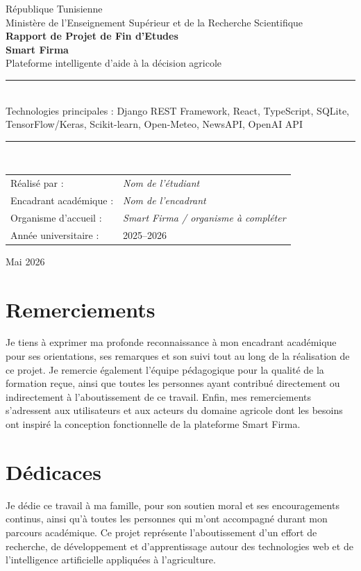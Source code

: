 \documentclass[12pt,a4paper]{report}
\begin{document}
\begin{titlepage}
\centering
\vspace*{1cm}
{\Large République Tunisienne}\\[0.2cm]
{\large Ministère de l'Enseignement Supérieur et de la Recherche Scientifique}\\[1.5cm]
{\Huge\bfseries Rapport de Projet de Fin d'Etudes}\\[0.8cm]
{\LARGE\bfseries Smart Firma}\\[0.3cm]
{\Large Plateforme intelligente d'aide à la décision agricole}\\[1cm]
\rule{0.85\textwidth}{0.5pt}\\[0.5cm]
{\large Technologies principales : Django REST Framework, React, TypeScript, SQLite, TensorFlow/Keras, Scikit-learn, Open-Meteo, NewsAPI, OpenAI API}\\[0.5cm]
\rule{0.85\textwidth}{0.5pt}\\[1.5cm]
\begin{tabular}{ll}
Réalisé par : & \textit{Nom de l'étudiant} \\
Encadrant académique : & \textit{Nom de l'encadrant} \\
Organisme d'accueil : & \textit{Smart Firma / organisme à compléter} \\
Année universitaire : & 2025--2026 \\
\end{tabular}
\vfill
{\large Mai 2026}
\end{titlepage}


\chapter*{Remerciements}
Je tiens à exprimer ma profonde reconnaissance à mon encadrant académique pour ses orientations, ses remarques et son suivi tout au long de la réalisation de ce projet. Je remercie également l'équipe pédagogique pour la qualité de la formation reçue, ainsi que toutes les personnes ayant contribué directement ou indirectement à l'aboutissement de ce travail. Enfin, mes remerciements s'adressent aux utilisateurs et aux acteurs du domaine agricole dont les besoins ont inspiré la conception fonctionnelle de la plateforme Smart Firma.

\chapter*{Dédicaces}
Je dédie ce travail à ma famille, pour son soutien moral et ses encouragements continus, ainsi qu'à toutes les personnes qui m'ont accompagné durant mon parcours académique. Ce projet représente l'aboutissement d'un effort de recherche, de développement et d'apprentissage autour des technologies web et de l'intelligence artificielle appliquées à l'agriculture.
\end{document}
